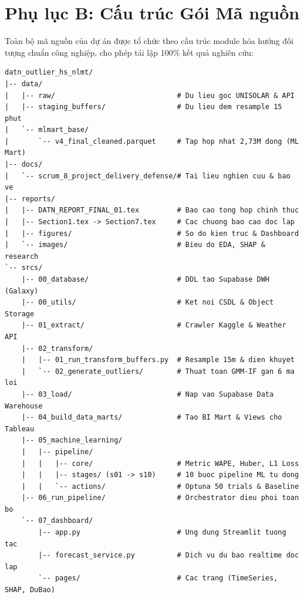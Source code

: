 \documentclass[12pt, a4paper]{report}
\begin{document}
\chapter*{Phụ lục B: Cấu trúc Gói Mã nguồn}
\label{app:code}

Toàn bộ mã nguồn của dự án được tổ chức theo cấu trúc module hóa hướng đối tượng chuẩn công nghiệp, cho phép tái lập 100\% kết quả nghiên cứu:

\begin{lstlisting}[basicstyle=\ttfamily\scriptsize, breaklines=false, numbers=none, caption={Sơ đồ cấu trúc cây thư mục mã nguồn của dự án The Outliers}]
datn_outlier_hs_nlmt/
|-- data/
|   |-- raw/                             # Du lieu goc UNISOLAR & API
|   |-- staging_buffers/                 # Du lieu dem resample 15 phut
|   `-- mlmart_base/
|       `-- v4_final_cleaned.parquet     # Tap hop nhat 2,73M dong (ML Mart)
|-- docs/
|   `-- scrum_8_project_delivery_defense/# Tai lieu nghien cuu & bao ve
|-- reports/
|   |-- DATN_REPORT_FINAL_01.tex         # Bao cao tong hop chinh thuc
|   |-- Section1.tex -> Section7.tex     # Cac chuong bao cao doc lap
|   |-- figures/                         # So do kien truc & Dashboard
|   `-- images/                          # Bieu do EDA, SHAP & research
`-- srcs/
    |-- 00_database/                     # DDL tao Supabase DWH (Galaxy)
    |-- 00_utils/                        # Ket noi CSDL & Object Storage
    |-- 01_extract/                      # Crawler Kaggle & Weather API
    |-- 02_transform/
    |   |-- 01_run_transform_buffers.py  # Resample 15m & dien khuyet
    |   `-- 02_generate_outliers/        # Thuat toan GMM-IF gan 6 ma loi
    |-- 03_load/                         # Nap vao Supabase Data Warehouse
    |-- 04_build_data_marts/             # Tao BI Mart & Views cho Tableau
    |-- 05_machine_learning/
    |   |-- pipeline/
    |   |   |-- core/                    # Metric WAPE, Huber, L1 Loss
    |   |   |-- stages/ (s01 -> s10)     # 10 buoc pipeline ML tu dong
    |   |   `-- actions/                 # Optuna 50 trials & Baseline
    |-- 06_run_pipeline/                 # Orchestrator dieu phoi toan bo
    `-- 07_dashboard/
        |-- app.py                       # Ung dung Streamlit tuong tac
        |-- forecast_service.py          # Dich vu du bao realtime doc lap
        `-- pages/                       # Cac trang (TimeSeries, SHAP, DuBao)
\end{lstlisting}


\end{document}
